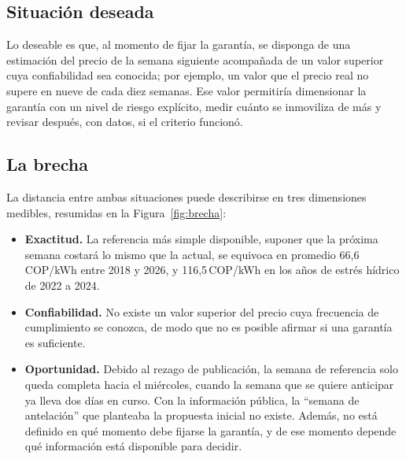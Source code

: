 \documentclass[11pt,letterpaper]{article}
\newcommand{\cop}{\,COP/kWh}
\begin{document}
\subsection{Situación deseada}

Lo deseable es que, al momento de fijar la garantía, se disponga de una
estimación del precio de la semana siguiente acompañada de un valor
superior cuya confiabilidad sea conocida; por ejemplo, un valor que el
precio real no supere en nueve de cada diez semanas. Ese valor permitiría
dimensionar la garantía con un nivel de riesgo explícito, medir
cuánto se inmoviliza de más y revisar después, con datos, si el criterio
funcionó.

\subsection{La brecha}

La distancia entre ambas situaciones puede describirse en tres
dimensiones medibles, resumidas en la Figura~\ref{fig:brecha}:

\begin{itemize}
  \item \textbf{Exactitud.} La referencia más simple disponible, suponer
        que la próxima semana costará lo mismo que la actual, se equivoca
        en promedio 66,6\cop{} entre 2018 y 2026, y 116,5\cop{} en los
        años de estrés hídrico de 2022 a 2024.
  \item \textbf{Confiabilidad.} No existe un valor superior del precio
        cuya frecuencia de cumplimiento se conozca, de modo que no es
        posible afirmar si una garantía es suficiente.
  \item \textbf{Oportunidad.} Debido al rezago de publicación, la semana
        de referencia solo queda completa hacia el miércoles, cuando la
        semana que se quiere anticipar ya lleva dos días en curso. Con la
        información pública, la ``semana de antelación'' que planteaba la
        propuesta inicial no existe. Además, no está definido en qué
        momento debe fijarse la garantía, y de ese momento depende qué
        información está disponible para decidir.
\end{itemize}
\end{document}
